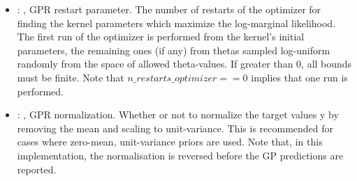 \begin{itemize}
\begin{itemize}
        \item {}: ,
          GPR restart parameter. The number of restarts of the optimizer for finding the
          kernel parameters which maximize the log-marginal likelihood. The first run of the
          optimizer                                                  is performed from the kernel’s
          initial parameters, the remaining ones (if any) from thetas
          sampled log-uniform randomly from the space of allowed theta-values. If greater than 0,
          all bounds must be finite. Note that $n\_restarts\_optimizer == 0$ implies that one run is
          performed.

        \item {}: ,
          GPR normalization. Whether or not to normalize the target values y by removing the mean
          and scaling                                                  to unit-variance. This is
          recommended for cases where zero-mean, unit-variance priors are used.
          Note that, in this implementation, the normalisation is reversed before the GP predictions
          are reported.
      \end{itemize}
  \end{itemize}
